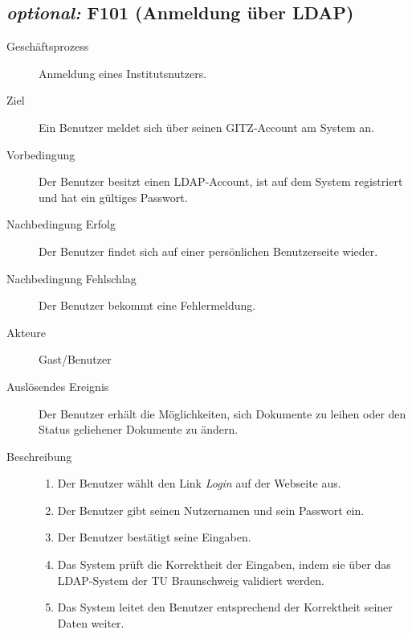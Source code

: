 \subsection{\emph{optional:} F101 (Anmeldung über LDAP)}
\label{F:AnmeldungAFS}
\begin{description}
  \item[Geschäftsprozess]Anmeldung eines Institutsnutzers.
  \item[Ziel]Ein Benutzer meldet sich über seinen \gls{GITZ}-Account am System an.
  \item[Vorbedingung]Der Benutzer besitzt einen \gls{LDAP}-Account, ist auf dem System registriert und hat ein gültiges Passwort.
  \item[Nachbedingung Erfolg]Der Benutzer findet sich auf einer persönlichen Benutzerseite wieder.
  \item[Nachbedingung Fehlschlag]Der Benutzer bekommt eine Fehlermeldung.
  \item[Akteure]Gast/Benutzer
  \item[Auslösendes Ereignis]Der Benutzer erhält die Möglichkeiten, sich Dokumente zu leihen oder den Status geliehener Dokumente zu ändern.
  \item[Beschreibung]\hfill
    \begin{enumerate}
      \item Der Benutzer wählt den Link \emph{Login} auf der Webseite aus.
      \item Der Benutzer gibt seinen Nutzernamen und sein Passwort ein.
      \item Der Benutzer bestätigt seine Eingaben.
      \item Das System prüft die Korrektheit der Eingaben, indem sie über das \gls{LDAP}-System der TU Braunschweig validiert werden.
      \item Das System leitet den Benutzer entsprechend der Korrektheit seiner Daten weiter.
    \end{enumerate}
\end{description}

